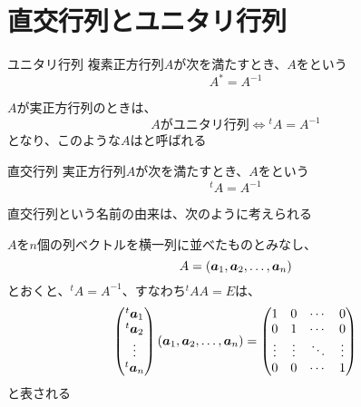 \documentclass[../../../topic_linear-algebra]{subfiles}
\begin{document}
\sectionline
\section{直交行列とユニタリ行列}

\begin{definition}{ユニタリ行列}
  複素正方行列$A$が次を満たすとき、$A$をという
  \begin{equation*}
    A^* = A^{-1}
  \end{equation*}
\end{definition}

$A$が実正方行列のときは、
\begin{equation*}
  A\text{がユニタリ行列} \Longleftrightarrow {}^tA = A^{-1}
\end{equation*}
となり、このような$A$はと呼ばれる

\begin{definition}{直交行列}
  実正方行列$A$が次を満たすとき、$A$をという
  \begin{equation*}
    {}^t A = A^{-1}
  \end{equation*}
\end{definition}

直交行列という名前の由来は、次のように考えられる

\br

$A$を$n$個の列ベクトルを横一列に並べたものとみなし、
\begin{equation*}
  A = (\vb*{a}_1, \vb*{a}_2, \ldots, \vb*{a}_n)
\end{equation*}
とおくと、${}^t A = A^{-1}$、すなわち${}^tAA = E$は、
\begin{equation*}
  \begin{pmatrix}
    {}^t \vb*{a}_1 \\
    {}^t \vb*{a}_2 \\
    \vdots         \\
    {}^t \vb*{a}_n
  \end{pmatrix} \left(
  \vb*{a}_1, \vb*{a}_2, \ldots, \vb*{a}_n
  \right) = \begin{pmatrix}
    1      & 0      & \cdots & 0      \\
    0      & 1      & \cdots & 0      \\
    \vdots & \vdots & \ddots & \vdots \\
    0      & 0      & \cdots & 1
  \end{pmatrix}
\end{equation*}
と表される
\end{document}
